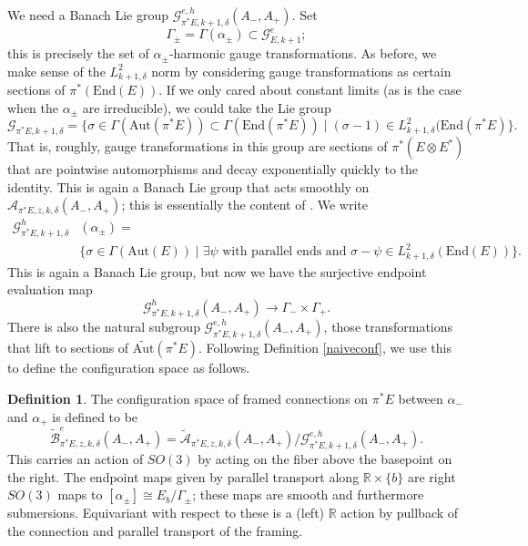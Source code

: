 \documentclass[10pt,a4paper]{amsart}
\newcommand{\pE}{\pi^* \! E}
\theoremstyle{definition}
\newtheorem{definition}[theorem]{Definition}
\theoremstyle{remark}
\numberwithin{figure}{qchap}
\begin{document}
We need a Banach Lie group $\mathcal G^{e,h}_{\pE,k+1,\delta}(A_-, A_+)$. Set 
$$\Gamma_\pm = \Gamma(\alpha_\pm) \subset \mathcal G^e_{E,k+1};$$ 
this is precisely the set of $\alpha_\pm$-harmonic gauge transformations. As before, we make sense of the $L^2_{k+1,\delta}$ norm by considering gauge transformations as certain sections of $\pi^*(\text{End}(E))$. If we only cared about constant limits (as is the case when the $\alpha_\pm$ are irreducible), we could take the Lie group 
$$\mathcal G_{\pE, k+1, \delta} = \{\sigma \in \Gamma(\text{Aut}(\pE)) \subset \Gamma(\text{End}(\pE)) \mid (\sigma - 1) \in L^2_{k+1,\delta}(\text{End}(\pE)\}.$$ 
That is, roughly, gauge transformations in this group are sections of $\pi^*(E \otimes E^*)$ that are pointwise automorphisms and decay exponentially quickly to the identity. This is again a Banach Lie group that acts smoothly on $\mathcal A_{\pE,z,k,\delta}(A_-, A_+)$; this is essentially the content of \cite[Section~4.3]{Don}. We write 
\begin{align*}
\mathcal G^{h}_{\pE, k+1, \delta}&(\alpha_\pm) = \\
&\{\sigma \in \Gamma(\text{Aut}(E)) \mid \exists \psi \text{ with parallel ends and } \sigma - \psi \in L^2_{k+1,\delta}(\text{End}(E))\}.
\end{align*}
This is again a Banach Lie group, but now we have the surjective endpoint evaluation map 
$$\mathcal G^{h}_{\pE, k+1, \delta}(A_-, A_+) \to \Gamma_- \times \Gamma_+.$$ 
There is also the natural subgroup $\mathcal G^{e,h}_{\pE, k+1, \delta}(A_-, A_+)$, those transformations that lift to sections of $\widetilde{\text{Aut}}(\pE)$. Following Definition \ref{naiveconf}, we use this to define the configuration space as follows. 

\begin{definition}\label{conf}The configuration space of framed connections on $\pE$ between $\alpha_-$ and $\alpha_+$ is defined to be $$\widetilde{\mathcal B}^{e}_{\pE, z, k, \delta}(A_-, A_+) = \widetilde{\mathcal A}_{\pE, z, k, \delta}(A_-, A_+)/\mathcal G^{e,h}_{\pE, k+1, \delta}(A_-, A_+).$$ This carries an action of $SO(3)$ by acting on the fiber above the basepoint on the right. The endpoint maps given by parallel transport along $\mathbb R \times \{b\}$ are right $SO(3)$ maps to $[\alpha_\pm] \cong E_b/\Gamma_\pm$; these maps are smooth and furthermore submersions. Equivariant with respect to these is a (left) $\mathbb R$ action by pullback of the connection and parallel transport of the framing.
\end{definition}
\end{document}
